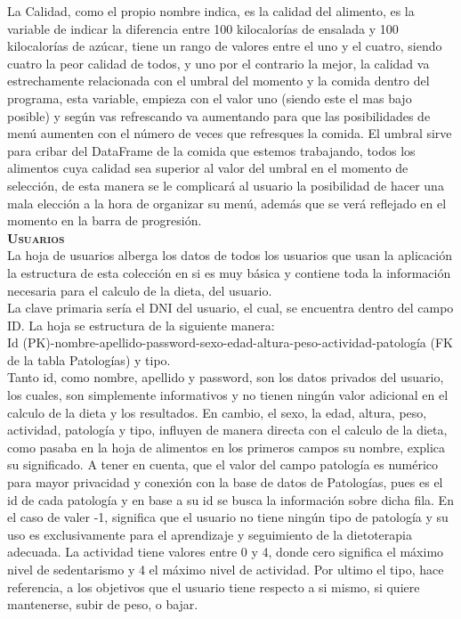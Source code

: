 La Calidad, como el propio nombre indica, es la calidad del alimento, es la variable de indicar la diferencia entre 100 kilocalorías de ensalada y 100 kilocalorías de azúcar, tiene un rango de valores entre el uno y el cuatro,  siendo cuatro la peor calidad de todos, y uno por el contrario la mejor, la calidad va estrechamente relacionada con el umbral del momento y la comida dentro del programa, esta variable, empieza con el valor uno (siendo este el mas bajo posible) y según vas refrescando va aumentando para que las posibilidades de menú aumenten con el número de veces que refresques la comida. El umbral sirve para cribar del DataFrame de la comida que estemos trabajando, todos los alimentos cuya calidad sea superior al valor del umbral en el momento de selección, de esta manera se le complicará al usuario la posibilidad de hacer una mala elección a la hora de organizar su menú, además que se verá reflejado en el momento en la barra de progresión.\\

\textbf{\textsc{Usuarios}}\\
La hoja de usuarios alberga los datos de todos los usuarios que usan la aplicación la estructura de esta colección en si es muy básica y contiene toda la información necesaria para el calculo de la dieta, del usuario.\\
La clave primaria sería el DNI del usuario, el cual, se encuentra dentro del campo ID. La hoja se estructura de la siguiente manera:\\
Id (PK)-nombre-apellido-password-sexo-edad-altura-peso-actividad-patología (FK de la tabla Patologías) y tipo.\\
Tanto id, como nombre, apellido y password, son los datos privados del usuario, los cuales, son simplemente informativos y no tienen ningún valor adicional en el calculo de la dieta y los resultados. En cambio, el sexo, la edad, altura, peso, actividad, patología y tipo, influyen de manera directa con el calculo de la dieta, como pasaba en la hoja de alimentos en los primeros campos su nombre, explica su significado. A tener en cuenta, que el valor del campo patología es numérico para mayor privacidad y conexión con la base de datos de Patologías, pues es el id de cada patología y en base a su id se busca la información sobre dicha fila. En el caso de valer -1, significa que el usuario no tiene ningún tipo de patología y su uso es exclusivamente para el aprendizaje y seguimiento de la dietoterapia adecuada. La actividad tiene valores entre 0 y 4, donde cero significa el máximo nivel de sedentarismo y 4 el máximo nivel de actividad. Por ultimo el tipo, hace referencia, a los objetivos que el usuario tiene respecto a si mismo, si quiere mantenerse, subir de peso, o bajar.\\

